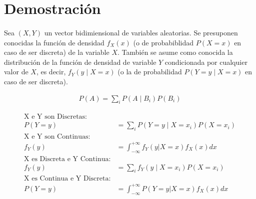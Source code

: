 \documentclass{article}
\begin{document}
	\maketitle
  \thispagestyle{empty}



  \section{Demostración}

    \paragraph{}
    Sea $(X, Y)$ un vector bidimiensional de variables aleatorias. Se presuponen conocidas la función de densidad  $f_X(x)$ (o de probabiblidad $P(X = x)$ en caso de ser discreta) de la variable $X$. También se asume como conocida la distribución de la función de densidad de variable $Y$ condicionada por cualquier valor de $X$, es decir, $f_Y(y \mid X = x)$ (o la de probabilidad $P(Y = y \mid X = x)$ en caso de ser discreta).
    
  \begin{align}
    P(A) = \sum_iP(A \mid B_i)P(B_i)
  \end{align}

  \begin{align}
    \text{X e Y son Discretas:}&\\
    P(Y=y) &= \sum_iP(Y = y \mid X = x_i)P(X = x_i)\\
    \text{X e Y son Continuas:}&\\
    f_{Y}(y) &=\int_{-\infty}^{+\infty}f_{Y}(y | X = x)f_X(x) dx \\
    \text{X es Discreta e Y Continua:}&\\
    f_{Y}(y) &= \sum_if_{Y}(y \mid X = x_i)P(X = x_i)\\
    \text{X es Continua e Y Discreta:}&\\
    P(Y = y) &=\int_{-\infty}^{+\infty}P( Y =y | X = x)f_X(x) dx \\
  \end{align}
	\nocite{prob2017}

  
  
\end{document}
